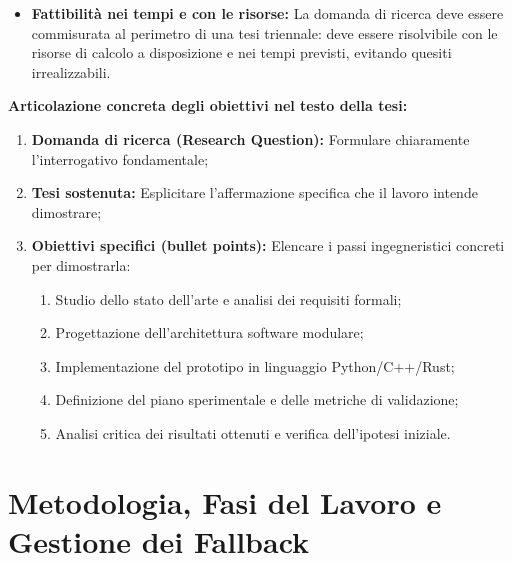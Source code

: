 \begin{itemize}
    \begin{quote}
    \textbf{Regola aurea:} Su una scala da 1 a 10, formulare la domanda corretta \textbf{vale almeno 6}. Una domanda formulata male vanifica mesi di programmazione.
    \end{quote}
    Per porre una domanda sensata, non banale e significativa, è indispensabile \textbf{fare ricerca preliminare, contaminarsi con la letteratura, capire cosa sta succedendo nello stato dell'arte} e individuare dove risiede il valore reale.
    \item \textbf{Fattibilità nei tempi e con le risorse:} La domanda di ricerca deve essere commisurata al perimetro di una tesi triennale: deve essere risolvibile con le risorse di calcolo a disposizione e nei tempi previsti, evitando quesiti irrealizzabili.
\end{itemize}

\vspace{0.3cm}
\textbf{Articolazione concreta degli obiettivi nel testo della tesi:}
\begin{enumerate}
    \item \textbf{Domanda di ricerca (Research Question):} Formulare chiaramente l'interrogativo fondamentale;
    \item \textbf{Tesi sostenuta:} Esplicitare l'affermazione specifica che il lavoro intende dimostrare;
    \item \textbf{Obiettivi specifici (bullet points):} Elencare i passi ingegneristici concreti per dimostrarla:
    \begin{enumerate}
        \item Studio dello stato dell'arte e analisi dei requisiti formali;
        \item Progettazione dell'architettura software modulare;
        \item Implementazione del prototipo in linguaggio Python/C++/Rust;
        \item Definizione del piano sperimentale e delle metriche di validazione;
        \item Analisi critica dei risultati ottenuti e verifica dell'ipotesi iniziale.
    \end{enumerate}
\end{enumerate}


\section{Metodologia, Fasi del Lavoro e Gestione dei Fallback}
\label{sec:metodologia}

